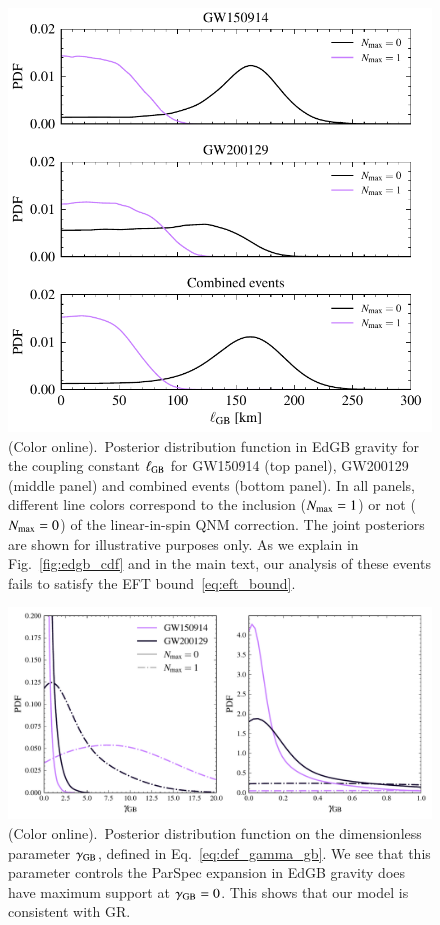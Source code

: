 \documentclass[twocolumn,
               prd,
               aps,
               superscriptaddress,
               tightenlines,
               nofootinbib,
               eqsecnum,
               amsfonts,
               amsmath,
               longbibliography]{revtex4-1}
\begin{document}
\begin{figure}[t]
\includegraphics[width=\columnwidth]{figs/edgb_posteriors_combined.pdf}
\caption{(Color online).~Posterior distribution function in EdGB gravity
for the coupling constant $\ell_{\rm GB}$ for GW150914 (top panel), GW200129 (middle panel)
and combined events (bottom panel).
%
In all panels, different line colors correspond to the inclusion ($N_{\rm max} = 1$) or not ($N_{\rm max} = 0$)
of the linear-in-spin QNM correction.
%
The joint posteriors are shown for illustrative purposes only. As we explain in Fig.~\ref{fig:edgb_cdf} and
in the main text, our analysis of these events fails to satisfy the EFT bound~\eqref{eq:eft_bound}.
}
\label{fig:edgb_exec_sum}
\end{figure}

\begin{figure}[h]
\includegraphics[width=\columnwidth]{figs/edgb_gamma.pdf}
\caption{(Color online).~Posterior distribution function on the dimensionless parameter $\gamma_{\rm GB}$,
defined in Eq.~\eqref{eq:def_gamma_gb}. We see that this parameter controls the ParSpec expansion in EdGB gravity
does have maximum support at $\gamma_{\rm GB} = 0$. This shows that our model is consistent with GR.
}
\label{fig:gamma_gb}
\end{figure}
\end{document}
